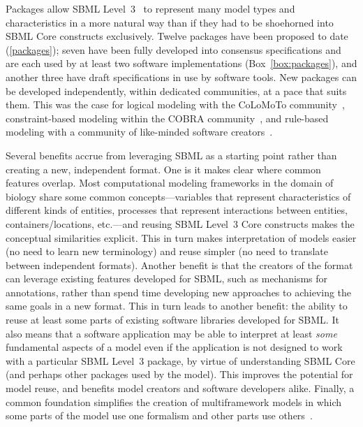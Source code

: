 \documentclass{sbml-paper}
\begin{document}
Packages allow SBML Level~3~\citep{Hucka2019systems} to represent many model types and characteristics in a more natural way than if they had to be shoehorned into SBML Core constructs exclusively.  Twelve packages have been proposed to date (\autoref{packages}); seven have been fully developed into consensus specifications and are each used by at least two software implementations (Box~\ref{box:packages}), and another three have draft specifications in use by software tools.  New packages can be developed independently, within dedicated communities, at a pace that suits them.  This was the case for logical modeling with the CoLoMoTo community~\citep{naldi2015cooperative}, constraint-based modeling within the COBRA community~\citep{Heirendt2019creation}, and rule-based modeling with a community of like-minded software creators~\citep{faeder2009rule, Palmisano2014multistate, zhang2013simmune, boutillier2018kappa}.

Several benefits accrue from leveraging SBML as a starting point rather than creating a new, independent format.  One is it makes clear where common features overlap.  Most computational modeling frameworks in the domain of biology share some common concepts---variables that represent characteristics of different kinds of entities, processes that represent interactions between entities, containers/locations, etc.---and reusing SBML Level~3 Core constructs makes the conceptual similarities explicit.  This in turn makes interpretation of models easier (no need to learn new terminology) and reuse simpler (no need to translate between independent formats).  Another benefit is that the creators of the format can leverage existing features developed for SBML, such as mechanisms for annotations, rather than spend time developing new approaches to achieving the same goals in a new format.  This in turn leads to another benefit: the ability to reuse at least some parts of existing software libraries developed for SBML.  It also means that a software application may be able to interpret at least \emph{some} fundamental aspects of a model even if the application is not designed to work with a particular SBML Level~3 package, by virtue of understanding SBML Core (and perhaps other packages used by the model).  This improves the potential for model reuse, and benefits model creators and software developers alike.  Finally, a common foundation simplifies the creation of multiframework models in which some parts of the model use one formalism and other parts use others~\citep[e.g., coupling kinetic models with flux-balance analysis;][]{Watanabe2018dynamic}.
\end{document}
